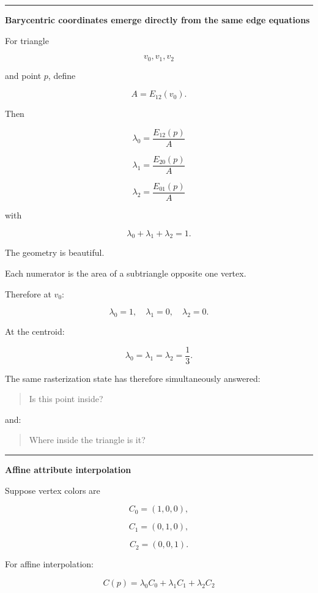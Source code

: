 \begin{center}\rule{0.5\linewidth}{0.5pt}\end{center}

\textbf{Barycentric coordinates emerge directly from the same edge equations}

For triangle

\[
v_0,v_1,v_2
\]

and point \(p\), define

\[
A=E_{12}(v_0).
\]

Then

\[
\boxed{
\lambda_0=
\frac{E_{12}(p)}{A}
}
\]

\[
\boxed{
\lambda_1=
\frac{E_{20}(p)}{A}
}
\]

\[
\boxed{
\lambda_2=
\frac{E_{01}(p)}{A}
}
\]

with

\[
\lambda_0+\lambda_1+\lambda_2=1.
\]

The geometry is beautiful.

Each numerator is the area of a subtriangle opposite one vertex.

Therefore at \(v_0\):

\[
\lambda_0=1,\quad
\lambda_1=0,\quad
\lambda_2=0.
\]

At the centroid:

\[
\lambda_0=
\lambda_1=
\lambda_2=
\frac13.
\]

The same rasterization state has therefore simultaneously answered:

\begin{quote}
Is this point inside?
\end{quote}

and:

\begin{quote}
Where inside the triangle is it?
\end{quote}

\begin{center}\rule{0.5\linewidth}{0.5pt}\end{center}

\textbf{Affine attribute interpolation}

Suppose vertex colors are

\[
C_0=(1,0,0),
\]

\[
C_1=(0,1,0),
\]

\[
C_2=(0,0,1).
\]

For affine interpolation:

\[
\boxed{
C(p)=
\lambda_0C_0+
\lambda_1C_1+
\lambda_2C_2
}
\]


